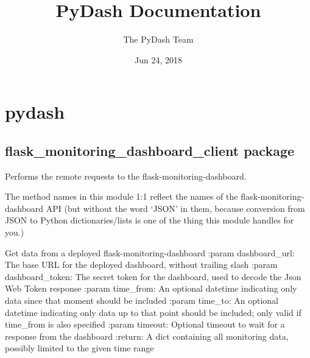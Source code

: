 \documentclass[letterpaper,10pt,english]{sphinxmanual}
\title{PyDash Documentation}
\date{Jun 24, 2018}
\author{The PyDash Team}
\begin{document}
\maketitle
\sphinxtableofcontents
{}\label{\detokenize{index::doc}}



\chapter{pydash}
\label{\detokenize{modules:pydash}}\label{\detokenize{modules::doc}}

\section{flask\_monitoring\_dashboard\_client package}
\label{\detokenize{flask_monitoring_dashboard_client:module-flask_monitoring_dashboard_client}}\label{\detokenize{flask_monitoring_dashboard_client:flask-monitoring-dashboard-client-package}}\label{\detokenize{flask_monitoring_dashboard_client::doc}}
Performs the remote requests to the flask-monitoring-dashboard.

The method names in this module 1:1 reflect the names of the flask-monitoring-dashboard API
(but without the word ‘JSON’ in them, because conversion from JSON to Python dictionaries/lists
is one of the thing this module handles for you.)

\begin{fulllineitems}
\label{\detokenize{flask_monitoring_dashboard_client:flask_monitoring_dashboard_client.get_data}}
Get data from a deployed flask-monitoring-dashboard
:param dashboard\_url: The base URL for the deployed dashboard, without trailing slash
:param dashboard\_token: The secret token for the dashboard, used to decode the Json Web Token response
:param time\_from: An optional datetime indicating only data since that moment should be included
:param time\_to: An optional datetime indicating only data up to that point should be included;
only valid if time\_from is also specified
:param timeout: Optional timeout to wait for a response from the dashboard
:return: A dict containing all monitoring data, possibly limited to the given time range

\end{fulllineitems}
\end{document}
